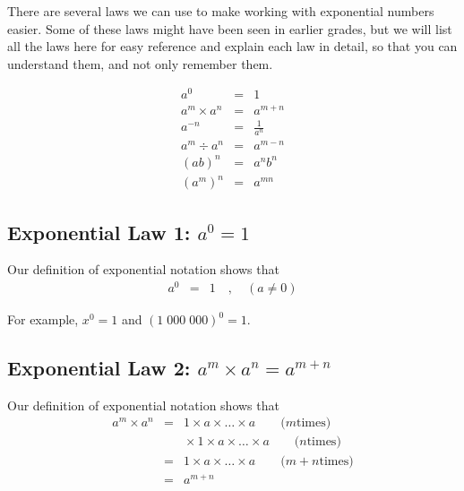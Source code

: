 \documentclass[10pt,a4paper,titlepage,twoside,openright]{report}
\begin{document}
There are several laws we can use to make working with exponential numbers easier. Some of these laws might have been seen in earlier grades, but we will list all the laws here for easy reference and explain each law in detail, so that you can understand them, and not only remember them.

\begin{eqnarray}
\label{eq:mn:e:law1}
a^0 &=& 1\\
\label{eq:mn:e:law2}
a^m \times a^n &=& a^{m+n} \\
\label{eq:mn:e:law3}
a^{-n} &=& \frac{1}{a^{n}}\\
\label{eq:mn:e:law4}
a^m \div a^n &=& a^{m-n} \\
\label{eq:mn:e:law5}
(ab)^n &=& a^nb^n \\
\label{eq:mn:e:law6}
(a^m)^n &=& a^{mn}
\end{eqnarray}

\subsection{Exponential Law 1: $a^0=1$}
Our definition of exponential notation shows that
\begin{eqnarray}
\label{eq:mn:e:law1:proof}
a^0 &=& 1\quad ,\quad (a \neq 0)
\end{eqnarray} 

For example, $x^0=1$ and $(1\;000\;000)^0=1$.



\subsection{Exponential Law 2: $a^m \times a^n=a^{m+n}$}
Our definition of exponential notation shows that
\begin{eqnarray}
\label{eq:mn:e:law2:proof}
a^m \times a^n &=& 1\times a\times\ldots\times a\qquad\textrm{(}m\textrm{
times)}\\\nonumber
&&\!\!\!\!\times 1\times a\times\ldots\times a\qquad\textrm{(}n\textrm{
times)}\\\nonumber
&=& 1\times a\times\ldots\times a\qquad\textrm{(}m+n\textrm{
times)}\\\nonumber
&=& a^{m+n}
\end{eqnarray}
\end{document}
